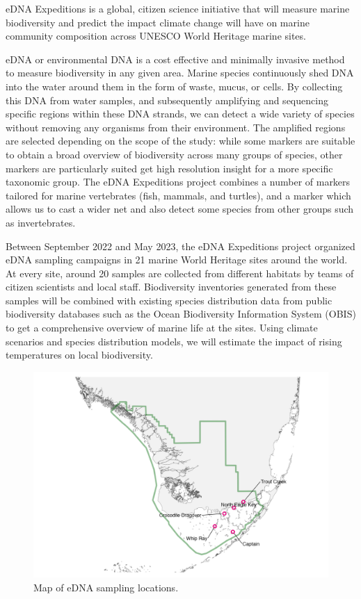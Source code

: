 \documentclass[10pt]{article}
\begin{document}
\begin{multicols}{2}
eDNA Expeditions is a global, citizen science initiative that will measure marine biodiversity and predict the impact climate change will have on marine community composition across UNESCO World Heritage marine sites.

eDNA or environmental DNA is a cost effective and minimally invasive method to measure biodiversity in any given area. Marine species continuously shed DNA into the water around them in the form of waste, mucus, or cells. By collecting this DNA from water samples, and subsequently amplifying and sequencing specific regions within these DNA strands, we can detect a wide variety of species without removing any organisms from their environment. The amplified regions are selected depending on the scope of the study: while some markers are suitable to obtain a broad overview of biodiversity across many groups of species, other markers are particularly suited get high resolution insight for a more specific taxonomic group. The eDNA Expeditions project combines a number of markers tailored for marine vertebrates (fish, mammals, and turtles), and a marker which allows us to cast a wider net and also detect some species from other groups such as invertebrates.

Between September 2022 and May 2023, the eDNA Expeditions project organized eDNA sampling campaigns in 21 marine World Heritage sites around the world. At every site, around 20 samples are collected from different habitats by teams of citizen scientists and local staff. Biodiversity inventories generated from these samples will be combined with existing species distribution data from public biodiversity databases such as the Ocean Biodiversity Information System (OBIS) to get a comprehensive overview of marine life at the sites. Using climate scenarios and species distribution models, we will estimate the impact of rising temperatures on local biodiversity.
\end{multicols}

\begin{figure}[h]
\centering
\includegraphics[width=\textwidth]{map}
\caption{Map of eDNA sampling locations.}
\end{figure}
\end{document}

